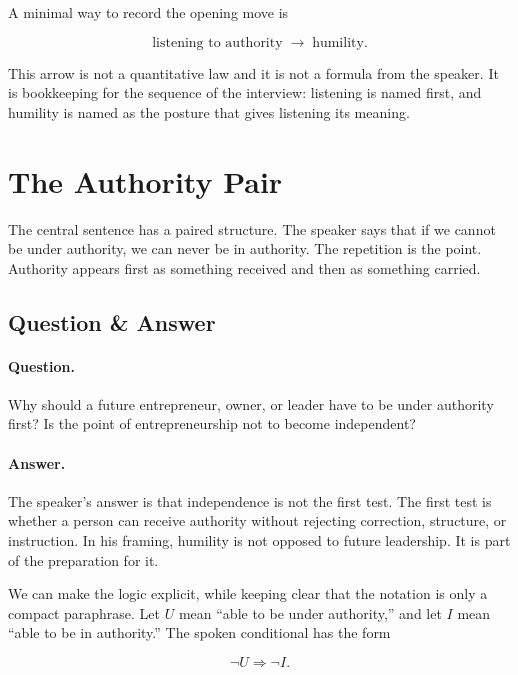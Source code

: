 A minimal way to record the opening move is

\begin{equation}
\text{listening to authority}
\;\longrightarrow\;
\text{humility}.
\end{equation}

This arrow is not a quantitative law and it is not a formula from the speaker. It is bookkeeping for the sequence of the interview: listening is named first, and humility is named as the posture that gives listening its meaning.

\section{The Authority Pair}

The central sentence has a paired structure. The speaker says that if we cannot be under authority, we can never be in authority. The repetition is the point. Authority appears first as something received and then as something carried.

\subsection{Question \& Answer}

\paragraph{Question.}
Why should a future entrepreneur, owner, or leader have to be under authority first? Is the point of entrepreneurship not to become independent?

\paragraph{Answer.}
The speaker's answer is that independence is not the first test. The first test is whether a person can receive authority without rejecting correction, structure, or instruction. In his framing, humility is not opposed to future leadership. It is part of the preparation for it.

We can make the logic explicit, while keeping clear that the notation is only a compact paraphrase. Let \(U\) mean ``able to be under authority,'' and let \(I\) mean ``able to be in authority.'' The spoken conditional has the form

\begin{equation}
\neg U \Longrightarrow \neg I.
\end{equation}

